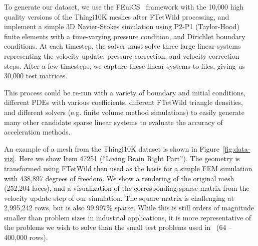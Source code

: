 \documentclass{svproc}
\begin{document}
To generate our dataset, we use the FEniCS~\cite{fenics} framework with the 10,000 high quality versions of the Thingi10K meshes after FTetWild processing, and implement a simple 3D Navier-Stokes simulation using P2-P1 (Taylor-Hood) finite elements with a time-varying pressure condition, and Dirichlet boundary conditions. At each timestep, the solver must solve three large linear systems representing the velocity update, pressure correction, and velocity correction steps. After a few timesteps, we capture these linear systems to files, giving us 30,000 test matrices. 

This process could be re-run with a variety of boundary and initial conditions, different PDEs with various coefficients, different FTetWild triangle densities, and different solvers (e.g. finite volume method simulations) to easily generate many other candidate sparse linear systems to evaluate the accuracy of acceleration methods.

An example of a mesh from the Thingi10K dataset is shown in Figure~\ref{fig:data-viz}. Here we show Item 47251 (``Living Brain Right Part''). The geometry is transformed using FTetWild then used as the basis for a simple FEM simulation with 438,897 degrees of freedom. We show a rendering of the original mesh (252,204 faces), and a visualization of the corresponding sparse matrix from the velocity update step of our simulation. The square matrix is challenging at 2,995,242 rows, but is also 99.997\% sparse. While this is still orders of magnitude smaller than problem sizes in industrial applications, it is more representative of the problems we wish to solve than the small test problems used in~\cite{Luz2020} (64 -- 400,000 rows).
\end{document}
